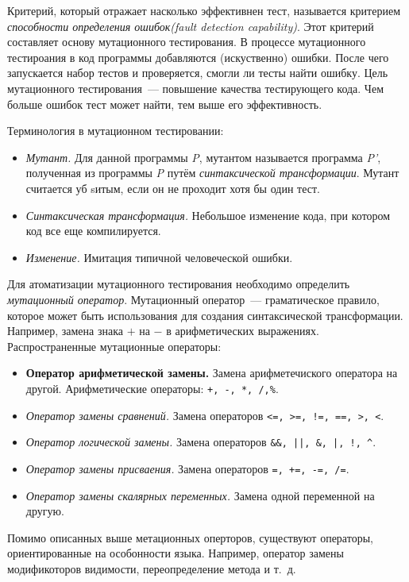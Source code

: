 Критерий, который отражает насколько эффективнен тест, называется критерием \textit{способности определения ошибок(fault detection capability)}. Этот критерий составляет основу мутационного тестирования. В процессе мутационного тестироания в код программы добавляются (искуственно) ошибки. После чего запускается набор тестов и проверяется, смогли ли тесты найти ошибку. Цель мутационного тестирования~--- повышение качества тестирующего кода. Чем больше ошибок тест может найти, тем выше его эффективность.

Терминология в мутационном тестировании:

\begin{itemize}
	\item \textit{Мутант.} Для данной программы \textit{P}, мутантом называется программа \textit{P'}, полученная из программы \textit{P} путём \textit{синтаксической трансформации}. Мутант считается уб sитым, если он не проходит хотя бы один тест.
	\item \textit{Синтаксическая трансформация.} Небольшое изменение кода, при котором код все еще компилируется.
	\item \textit{Изменение.} Имитация типичной человеческой ошибки. 
\end{itemize}

Для атоматизации мутационного тестирования необходимо определить \textit{мутационный оператор}. Мутационный оператор~--- граматическое правило, которое может быть использования для создания синтаксической трансформации. Например, замена знака \(+\) на 
\(-\) в арифметических выражениях. Распространенные мутационные операторы:

\begin{itemize}
	\item \textbf{Оператор арифметической замены.} Замена арифметечиского оператора на другой. Арифметические операторы: \texttt{+, -, *, /,\%}.
	\item \textit{Оператор замены сравнений.} Замена операторов \texttt{<=, >=, !=, ==, >, <}.
	\item \textit{Оператор логической замены.} Замена операторов \texttt{\&\&, ||, \&, |, !, \^}.
	\item \textit{Оператор замены присваения.} Замена операторов \texttt{=, +=, -=, /=}.
	\item \textit{Оператор замены скалярных переменных.}  Замена одной переменной на другую.
\end{itemize}

Помимо описанных выше метационных оперторов, существуют операторы, ориентированные на особонности языка. Например, оператор замены модификоторов видимости, переопределение метода и т.~д.

